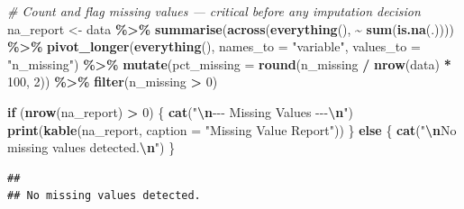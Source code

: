 \documentclass[
]{article}
\newenvironment{Shaded}{\begin{snugshade}}{\end{snugshade}}
\newcommand{\AttributeTok}[1]{\textcolor[rgb]{0.13,0.29,0.53}{#1}}
\newcommand{\CommentTok}[1]{\textcolor[rgb]{0.56,0.35,0.01}{\textit{#1}}}
\newcommand{\ControlFlowTok}[1]{\textcolor[rgb]{0.13,0.29,0.53}{\textbf{#1}}}
\newcommand{\DecValTok}[1]{\textcolor[rgb]{0.00,0.00,0.81}{#1}}
\newcommand{\FunctionTok}[1]{\textcolor[rgb]{0.13,0.29,0.53}{\textbf{#1}}}
\newcommand{\NormalTok}[1]{#1}
\newcommand{\OtherTok}[1]{\textcolor[rgb]{0.56,0.35,0.01}{#1}}
\newcommand{\SpecialCharTok}[1]{\textcolor[rgb]{0.81,0.36,0.00}{\textbf{#1}}}
\newcommand{\StringTok}[1]{\textcolor[rgb]{0.31,0.60,0.02}{#1}}
\begin{document}
\begin{Shaded}
\begin{Highlighting}[]
\CommentTok{\# Count and flag missing values — critical before any imputation decision}
\NormalTok{na\_report }\OtherTok{\textless{}{-}}\NormalTok{ data }\SpecialCharTok{\%\textgreater{}\%}
  \FunctionTok{summarise}\NormalTok{(}\FunctionTok{across}\NormalTok{(}\FunctionTok{everything}\NormalTok{(), }\SpecialCharTok{\textasciitilde{}} \FunctionTok{sum}\NormalTok{(}\FunctionTok{is.na}\NormalTok{(.)))) }\SpecialCharTok{\%\textgreater{}\%}
  \FunctionTok{pivot\_longer}\NormalTok{(}\FunctionTok{everything}\NormalTok{(), }\AttributeTok{names\_to =} \StringTok{"variable"}\NormalTok{, }\AttributeTok{values\_to =} \StringTok{"n\_missing"}\NormalTok{) }\SpecialCharTok{\%\textgreater{}\%}
  \FunctionTok{mutate}\NormalTok{(}\AttributeTok{pct\_missing =} \FunctionTok{round}\NormalTok{(n\_missing }\SpecialCharTok{/} \FunctionTok{nrow}\NormalTok{(data) }\SpecialCharTok{*} \DecValTok{100}\NormalTok{, }\DecValTok{2}\NormalTok{)) }\SpecialCharTok{\%\textgreater{}\%}
  \FunctionTok{filter}\NormalTok{(n\_missing }\SpecialCharTok{\textgreater{}} \DecValTok{0}\NormalTok{)}

\ControlFlowTok{if}\NormalTok{ (}\FunctionTok{nrow}\NormalTok{(na\_report) }\SpecialCharTok{\textgreater{}} \DecValTok{0}\NormalTok{) \{}
  \FunctionTok{cat}\NormalTok{(}\StringTok{"}\SpecialCharTok{\textbackslash{}n}\StringTok{{-}{-}{-} Missing Values {-}{-}{-}}\SpecialCharTok{\textbackslash{}n}\StringTok{"}\NormalTok{)}
  \FunctionTok{print}\NormalTok{(}\FunctionTok{kable}\NormalTok{(na\_report, }\AttributeTok{caption =} \StringTok{"Missing Value Report"}\NormalTok{))}
\NormalTok{\} }\ControlFlowTok{else}\NormalTok{ \{}
  \FunctionTok{cat}\NormalTok{(}\StringTok{"}\SpecialCharTok{\textbackslash{}n}\StringTok{No missing values detected.}\SpecialCharTok{\textbackslash{}n}\StringTok{"}\NormalTok{)}
\NormalTok{\}}
\end{Highlighting}
\end{Shaded}

\begin{verbatim}
## 
## No missing values detected.
\end{verbatim}
\end{document}

